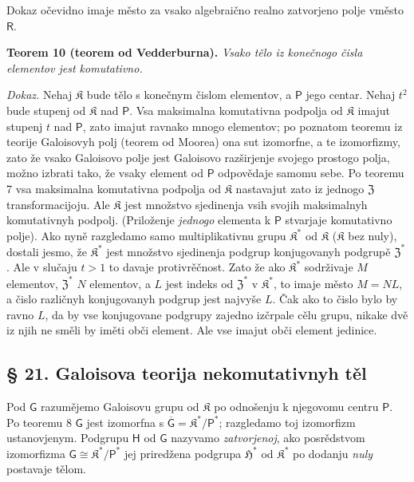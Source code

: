 \documentclass[11pt]{article}
\begin{document}
Dokaz očevidno imaje město za vsako algebraično realno zatvorjeno polje vměsto \(\mathsf{R}\).

\textbf{Teorem 10 (teorem od Vedderburna).} \emph{Vsako tělo iz konečnogo čisla elementov jest komutativno.}

\emph{Dokaz.} Nehaj \(\mathfrak K\) bude tělo s konečnym čislom elementov, a \(\mathsf P\) jego centar. Nehaj \(t^2\) bude stupenj od \(\mathfrak K\) nad \(\mathsf P\). Vsa maksimalna komutativna podpolja od \(\mathfrak K\) imajut stupenj \(t\) nad \(\mathsf P\), zato imajut ravnako mnogo elementov; po poznatom teoremu iz teorije Galoisovyh polj (teorem od Moorea) ona sut izomorfne, a te izomorfizmy, zato že vsako Galoisovo polje jest Galoisovo razširjenje svojego prostogo polja, možno izbrati tako, že vsaky element od \(\mathsf P\) odpovědaje samomu sebe. Po teoremu 7 vsa maksimalna komutativna podpolja od \(\mathfrak K\) nastavajut zato iz jednogo \(\mathfrak Z\) transformacijoju. Ale \(\mathfrak K\) jest množstvo sjedinenja vsih svojih maksimalnyh komutativnyh podpolj. (Priloženje \emph{jednogo} elementa k \(\mathsf P\) stvarjaje komutativno polje). Ako nyně razgledamo samo multiplikativnu grupu \(\mathfrak K^*\) od \(\mathfrak K\) (\(\mathfrak K\) bez nuly), dostali jesmo, že \(\mathfrak K^*\) jest množstvo sjedinenja podgrup konjugovanyh podgrupě \(\mathfrak Z^*\). Ale v slučaju \(t>1\) to davaje protivrěčnost. Zato že ako \(\mathfrak K^*\) sodrživaje \(M\) elementov, \(\mathfrak Z^*\) \(N\) elementov, a \(L\) jest indeks od \(\mathfrak Z^*\) v \(\mathfrak K^*\), to imaje město \(M=NL\), a čislo različnyh konjugovanyh podgrup jest najvyše \(L\). Čak ako to čislo bylo by ravno \(L\), da by vse konjugovane podgrupy zajedno izčrpale cělu grupu, nikake dvě iz njih ne směli by iměti obči element. Ale vse imajut obči element jedinice.

\subsection*{§ 21. Galoisova teorija nekomutativnyh těl}\label{die-galoissche-theorie-der-nichtkommutativen-koerper}

Pod \(\mathsf{G}\) razumějemo Galoisovu grupu od \(\mathfrak K\) po odnošenju k njegovomu centru \(\mathsf P\). Po teoremu 8 \(\mathsf{G}\) jest izomorfna s \(\overline{\mathsf G}=\mathfrak K^*/\mathsf P^*\); razgledamo toj izomorfizm ustanovjenym. Podgrupu \(\mathsf{H}\) od \(\mathsf{G}\) nazyvamo \emph{zatvorjenoj}, ako posrědstvom izomorfizma \(\mathsf{G}\cong\mathfrak K^*/\mathsf P^*\) jej priredžena podgrupa \(\mathfrak H^*\) od \(\mathfrak K^*\) po dodanju \emph{nuly} postavaje tělom.
\end{document}
